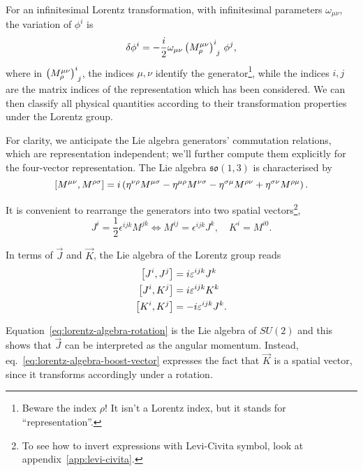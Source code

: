 For an infinitesimal Lorentz transformation, with infinitesimal parameters $\omega_{\mu\nu}$, the variation of $\phi^i$ is
\begin{equation}\label{eq:action-lorentz-transf}
    \delta \phi^i = -\frac{i}{2} \omega_{\mu\nu} \tensor{\left(  M^{\mu\nu}_\rho \right)}{^i_j} \, \phi^j, 
\end{equation}
where in $\tensor{\left(  M^{\mu\nu}_\rho \right)}{^i_j}$, the indices $\mu,\nu$ identify the generator\footnote{Beware the index $\rho$! It isn't a Lorentz index, but it stands for “representation”.}, while the indices $i,j$ are the matrix indices of the representation which has been considered. We can then classify all physical quantities according to their transformation properties under the Lorentz group.

For clarity, we anticipate the Lie algebra generators' commutation relations, which are representation independent; we'll further compute them explicitly for the four-vector representation. The Lie algebra $\mathfrak{so}(1,3)$ is characterised by
\begin{equation}\label{eq:lorentz-algebra-relations}
    \comm{M^{\mu\nu}}{M^{\rho\sigma}} = i \left( \eta^{\nu\rho} M^{\mu\sigma} - \eta^{\mu\rho} M^{\nu\sigma} - \eta^{\sigma\mu} M^{\rho\nu} + \eta^{\sigma\nu} M^{\rho\mu} \right).
\end{equation}

It is convenient to rearrange the generators into two spatial vectors\footnote{To see how to invert expressions with Levi-Civita symbol, look at appendix~\ref{app:levi-civita}.},
\begin{equation}\label{eq:redef-lorentz-gen}
    J^i = \frac{1}{2} \epsilon^{ijk} M^{jk} \iff M^{ij} = \epsilon^{ijk} J^k, \quad K^i = M^{i0} .
\end{equation}

In terms of $\vec{J}$ and $\vec{K}$, the Lie algebra of the Lorentz group reads
\begin{subequations}
\begin{align}
    \comm{J^i}{J^j} &= i \epsilon^{ijk} J^k \label{eq:lorentz-algebra-rotation} \\ 
    \comm{J^i}{K^j} &= i \epsilon^{ijk} K^k \label{eq:lorentz-algebra-boost-vector} \\ 
    \comm{K^i}{K^j} &= -i \epsilon^{ijk} J^k .
\end{align}
\end{subequations}

Equation~\eqref{eq:lorentz-algebra-rotation} is the Lie algebra of $SU(2)$ and this shows that $\vec{J}$ can be interpreted as the angular momentum. Instead, eq.~\eqref{eq:lorentz-algebra-boost-vector} expresses the fact that $\vec{K}$ is a spatial vector, since it transforms accordingly under a rotation. 

